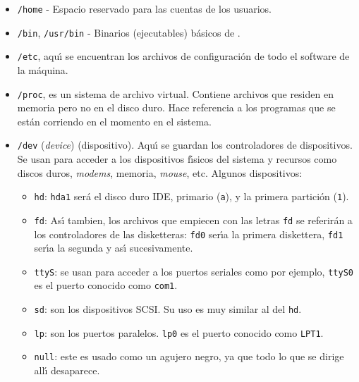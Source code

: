 \begin{itemize}

\item \verb+/home+ - Espacio reservado para las cuentas de los usuarios.

\item \verb+/bin+, \verb+/usr/bin+ - Binarios (ejecutables) b{\'a}sicos de \unix.

\item \verb+/etc+, aqu{\'\i} se encuentran los archivos de configuraci{\'o}n de
  todo el software de la m{\'a}quina.
  
\item \verb+/proc+, es un sistema de archivo virtual. Contiene
  archivos que residen en memoria pero no en el disco duro. Hace
  referencia a los programas que se est\'an corriendo en el momento en
  el sistema.
  
\item \verb+/dev+ ({\it device}) (dispositivo). Aqu{\'\i} se guardan los
  controladores de dispositivos. Se usan para acceder a los
  dispositivos f{\'\i}sicos del sistema y recursos como discos duros, {\it
    modems}, memoria, {\it mouse}, etc.  Algunos dispositivos:
\begin{itemize}

\item \verb+hd+: \verb+hda1+ ser{\'a} el disco duro IDE, primario (\verb+a+), y la primera 
partici{\'o}n (\verb+1+).
 
\item \verb+fd+: As{\'\i} tambien, los archivos que empiecen con las letras
  \verb+fd+ se referir{\'a}n a los controladores de las disketteras:
  \verb+fd0+ ser{\'\i}a la primera diskettera, \verb+fd1+ ser{\'\i}a la segunda y
  as{\'\i} sucesivamente.
  
\item \verb+ttyS+: se usan para acceder a los puertos seriales como
  por ejemplo, \verb+ttyS0+ es el puerto conocido como \verb+com1+.
  
\item \verb+sd+: son los dispositivos SCSI. Su uso es muy similar al
  del \verb+hd+.
  
\item \verb+lp+: son los puertos paralelos. \verb+lp0+ es el puerto
  conocido como \verb+LPT1+.
  
\item \verb+null+: este es usado como un agujero negro, ya que todo lo
  que se dirige all{\'\i} desaparece.
  

\end{itemize}
\end{itemize}

